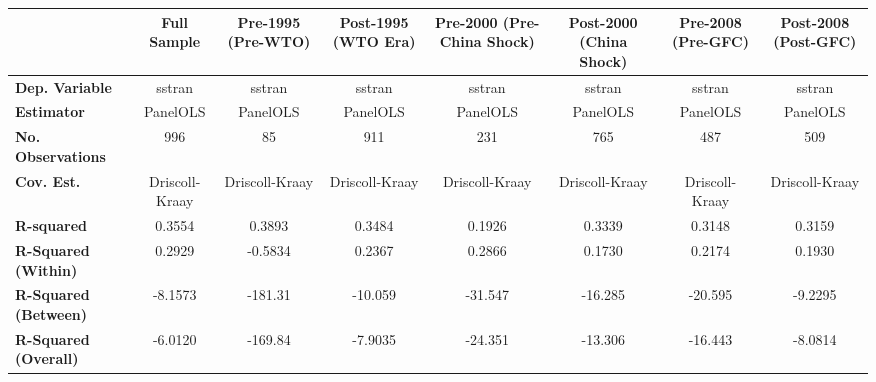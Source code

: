 \begin{center}
\begin{tabular}{lccccccc}
\toprule
                                   & \textbf{Full Sample} & \textbf{Pre-1995 (Pre-WTO)} & \textbf{Post-1995 (WTO Era)} & \textbf{Pre-2000 (Pre-China Shock)} & \textbf{Post-2000 (China Shock)} & \textbf{Pre-2008 (Pre-GFC)} & \textbf{Post-2008 (Post-GFC)}  \\
\midrule
\textbf{Dep. Variable}             &        sstran        &            sstran           &            sstran            &                sstran               &              sstran              &            sstran           &             sstran             \\
\textbf{Estimator}                 &       PanelOLS       &           PanelOLS          &           PanelOLS           &               PanelOLS              &             PanelOLS             &           PanelOLS          &            PanelOLS            \\
\textbf{No. Observations}          &         996          &              85             &             911              &                 231                 &               765                &             487             &              509               \\
\textbf{Cov. Est.}                 &    Driscoll-Kraay    &        Driscoll-Kraay       &        Driscoll-Kraay        &            Driscoll-Kraay           &          Driscoll-Kraay          &        Driscoll-Kraay       &         Driscoll-Kraay         \\
\textbf{R-squared}                 &        0.3554        &            0.3893           &            0.3484            &                0.1926               &              0.3339              &            0.3148           &             0.3159             \\
\textbf{R-Squared (Within)}        &        0.2929        &           -0.5834           &            0.2367            &                0.2866               &              0.1730              &            0.2174           &             0.1930             \\
\textbf{R-Squared (Between)}       &       -8.1573        &           -181.31           &           -10.059            &               -31.547               &             -16.285              &           -20.595           &            -9.2295             \\
\textbf{R-Squared (Overall)}       &       -6.0120        &           -169.84           &           -7.9035            &               -24.351               &             -13.306              &           -16.443           &            -8.0814             \\

\end{tabular}
\end{center}
